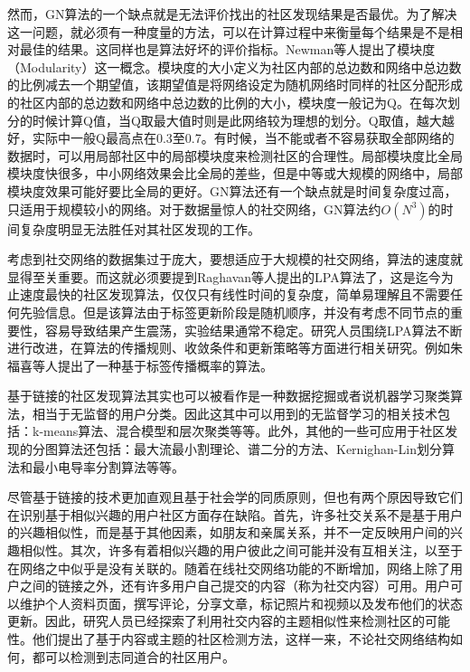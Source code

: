 然而，GN算法的一个缺点就是无法评价找出的社区发现结果是否最优。为了解决这一问题，就必须有一种度量的方法，可以在计算过程中来衡量每个结果是不是相对最佳的结果。这同样也是算法好坏的评价指标。Newman等人提出了模块度（Modularity）\cite{NewmanFind}这一概念。模块度的大小定义为社区内部的总边数和网络中总边数的比例减去一个期望值，该期望值是将网络设定为随机网络时同样的社区分配形成的社区内部的总边数和网络中总边数的比例的大小，模块度一般记为Q。在每次划分的时候计算Q值，当Q取最大值时则是此网络较为理想的划分。Q取值，越大越好，实际中一般Q最高点在0.3至0.7。有时候，当不能或者不容易获取全部网络的数据时，可以用局部社区中的局部模块度来检测社区的合理性。局部模块度比全局模块度快很多，中小网络效果会比全局的差些，但是中等或大规模的网络中，局部模块度效果可能好要比全局的更好。GN算法还有一个缺点就是时间复杂度过高，只适用于规模较小的网络。对于数据量惊人的社交网络，GN算法约$O(N^3)$的时间复杂度明显无法胜任对其社区发现的工作。

考虑到社交网络的数据集过于庞大，要想适应于大规模的社交网络，算法的速度就显得至关重要。而这就必须要提到Raghavan等人提出的LPA算法\cite{Raghavan2007Near}了，这是迄今为止速度最快的社区发现算法，仅仅只有线性时间的复杂度，简单易理解且不需要任何先验信息。但是该算法由于标签更新阶段是随机顺序，并没有考虑不同节点的重要性，容易导致结果产生震荡，实验结果通常不稳定。研究人员围绕LPA算法不断进行改进，在算法的传播规则、收敛条件和更新策略等方面进行相关研究。例如朱福喜等人提出了一种基于标签传播概率的算法\cite{Liu2016A}。

基于链接的社区发现算法其实也可以被看作是一种数据挖掘或者说机器学习聚类算法，相当于无监督的用户分类。因此这其中可以用到的无监督学习的相关技术包括：k-means算法、混合模型和层次聚类等等。此外，其他的一些可应用于社区发现的分图算法还包括：最大流最小割理论\cite{Jr2009Maximal}、谱二分的方法\cite{Pothen1990Partitioning}、Kernighan-Lin划分算法\cite{Kernigan1970An}和最小电导率分割算法\cite{Leskovec2005Graphs}等等。

尽管基于链接的技术更加直观且基于社会学的同质原则，但也有两个原因导致它们在识别基于相似兴趣的用户社区方面存在缺陷。首先，许多社交关系不是基于用户的兴趣相似性，而是基于其他因素，如朋友和亲属关系，并不一定反映用户间的兴趣相似性。其次，许多有着相似兴趣的用户彼此之间可能并没有互相关注，以至于在网络之中似乎是没有关联的\cite{Deng2013Interaction}。随着在线社交网络功能的不断增加，网络上除了用户之间的链接之外，还有许多用户自己提交的内容（称为社交内容）可用。用户可以维护个人资料页面，撰写评论，分享文章，标记照片和视频以及发布他们的状态更新。因此，研究人员已经探索了利用社交内容的主题相似性来检测社区的可能性。他们提出了基于内容或主题的社区检测方法，这样一来，不论社交网络结构如何，都可以检测到志同道合的社区用户\cite{Natarajan2013Community}。

